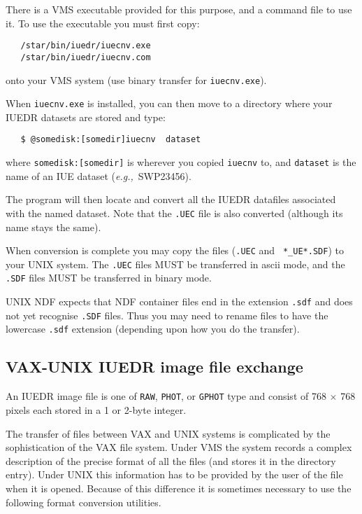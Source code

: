 There is a VMS executable provided for this purpose, and a command file
to use it. To use the executable you must first copy:

\begin{verbatim}
   /star/bin/iuedr/iuecnv.exe
   /star/bin/iuedr/iuecnv.com
\end{verbatim}

onto your VMS system (use binary transfer for {\tt iuecnv.exe}).

When {\tt iuecnv.exe} is installed, you can then move to a directory
where your IUEDR datasets are stored and type:

\begin{verbatim}
   $ @somedisk:[somedir]iuecnv  dataset
\end{verbatim}

where {\tt somedisk:[somedir]} is wherever you copied {\tt iuecnv} to, and
{\tt dataset} is the name of an IUE dataset ({\it{e.g.,}}\ SWP23456).

The program will then locate and convert all the IUEDR datafiles
associated with the named dataset. Note that the {\tt .UEC} file is also
converted (although its name stays the same).

When conversion is complete you may copy the files ({\tt .UEC} and {\tt
*\_UE*.SDF}) to your UNIX system. The {\tt .UEC} files MUST be
transferred in ascii mode, and the {\tt .SDF} files MUST be transferred
in binary mode.

UNIX NDF expects that NDF container files end in the extension \verb+.sdf+ and
does not yet recognise \verb+.SDF+ files. Thus you may need to rename
files to have the lowercase \verb+.sdf+ extension (depending upon how
you do the transfer).

\subsection{VAX-UNIX IUEDR image file exchange}

An IUEDR image file is one of \verb+RAW+, \verb+PHOT+, or \verb+GPHOT+ type
and consist of 768 $\times$ 768 pixels each stored in a 1 or 2-byte integer.

The transfer of files between VAX and UNIX systems is complicated by
the sophistication of the VAX file system. Under VMS the system
records a complex description of the precise format of all the  files
(and stores it in  the directory entry). Under UNIX this information
has to be provided by the user of the file when it is  opened. Because
of this difference it is sometimes necessary to use the following
format conversion utilities.

